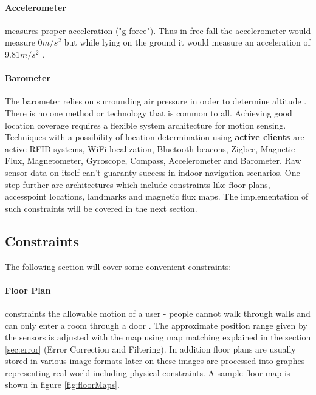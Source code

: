 \paragraph{Accelerometer} measures proper acceleration ("g-force"). Thus in free fall the accelerometer would measure $0 m/s^2$ but while lying on the ground it would measure an acceleration of $9.81 m/s^2$ \parencite{accelerometer}.

\paragraph{Barometer} The barometer relies on surrounding air pressure in order to determine altitude \parencite{barometer}. 
\\

There is no one method or technology that is common to all. Achieving good location coverage requires a flexible system architecture for motion sensing. Techniques with a possibility of location determination using \textbf{active clients} are active RFID systems, WiFi localization, Bluetooth beacons, Zigbee, Magnetic Flux, Magnetometer, Gyroscope, Compass, Accelerometer and Barometer. Raw sensor data on itself can't guaranty success in indoor navigation scenarios. One step further are architectures which include constraints like floor plans, accesspoint locations, landmarks and magnetic flux maps. The implementation of such constraints will be covered in the next section.

\subsection{Constraints}

The following section will cover some convenient constraints:

\paragraph{Floor Plan} constraints the allowable motion of a user - people cannot walk through walls and can only enter a room through a door \textcite{mapCraft}. The approximate position range given by the sensors is adjusted with the map using map matching explained in the section \ref{sec:error} (Error Correction and Filtering). In addition floor plans are usually stored in various image formats \parencite{mapCraft} \parencite{googleMaps} later on these images are processed into graphes representing real world including physical constraints. A sample floor map is shown in figure \ref{fig:floorMaps}.

